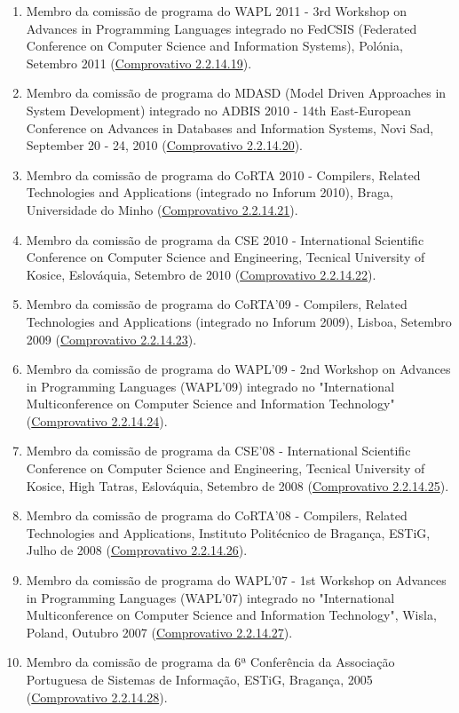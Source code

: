 \documentclass[11pt]{article}
\begin{document}
\begin{enumerate}
\item  {Membro da comissão de programa do WAPL 2011 - 3rd Workshop on Advances in Programming Languages integrado no FedCSIS (Federated Conference on Computer Science and Information Systems), Polónia, Setembro 2011 (\href{run:ComprovativosCOCP/CPWAPL2011.pdf}{Comprovativo 2.2.14.19}).}
\item {Membro da comissão de programa do MDASD (Model Driven Approaches in System Development) integrado no ADBIS 2010 - 14th East-European Conference on Advances in Databases and Information Systems, Novi Sad, September 20 - 24, 2010 (\href{run:ComprovativosCOCP/CPMDASD2010.pdf}{Comprovativo 2.2.14.20}).}
\item {Membro da comissão de programa do CoRTA 2010 - Compilers, Related Technologies and Applications (integrado no Inforum 2010), Braga, Universidade do Minho (\href{run:ComprovativosCOCP/CPCoRTA2010.pdf}{Comprovativo 2.2.14.21}).}
\item {Membro da comissão de programa da CSE 2010 - International Scientific Conference on Computer Science and Engineering, Tecnical University of Kosice, Eslováquia, Setembro de 2010 (\href{run:ComprovativosCOCP/CPCSE2010.pdf}{Comprovativo 2.2.14.22}).}
\item {Membro da comissão de programa do CoRTA'09 - Compilers, Related Technologies and Applications (integrado no Inforum 2009), Lisboa, Setembro 2009 (\href{run:ComprovativosCOCP/CPCoRTA2009.pdf}{Comprovativo 2.2.14.23}).}
\item {Membro da comissão de programa do WAPL'09 - 2nd Workshop on Advances in Programming Languages (WAPL'09) integrado no "International Multiconference on Computer Science and Information Technology" (\href{run:ComprovativosCOCP/CPWAPL09.pdf}{Comprovativo 2.2.14.24}).}
\item {Membro da comissão de programa da CSE'08 - International Scientific Conference on Computer Science and Engineering, Tecnical University of Kosice, High Tatras, Eslováquia, Setembro de 2008 (\href{run:ComprovativosCOCP/CPCSE2008.pdf}{Comprovativo 2.2.14.25}).}
\item {Membro da comissão de programa do CoRTA'08 - Compilers, Related Technologies and Applications, Instituto Politécnico de Bragança, ESTiG, Julho de 2008 (\href{run:ComprovativosCOCP/COCPCoRTA08.pdf}{Comprovativo 2.2.14.26}).}
\item {Membro da comissão de programa do WAPL'07 - 1st Workshop on Advances in Programming Languages (WAPL'07) integrado no "International Multiconference on Computer Science and Information Technology", Wisla, Poland, Outubro 2007 (\href{run:ComprovativosCOCP/CPWAPL07.pdf}{Comprovativo 2.2.14.27}).}
\item{Membro da comissão de programa da 6ª Conferência da Associação Portuguesa de Sistemas de Informação, ESTiG, Bragança, 2005 (\href{run:ComprovativosCOCP/CPAPSI05.pdf}{Comprovativo 2.2.14.28}).}
\end{enumerate}
\end{document}
